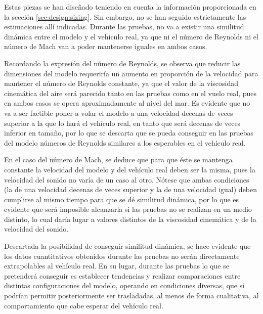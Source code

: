 Estas piezas se han diseñado teniendo en cuenta la información proporcionada en la sección \ref{sec:design:sizing}. Sin embargo, no se han seguido estrictamente las estimaciones allí indicadas. Durante las pruebas, no va a existir una similitud dinámica entre el modelo y el vehículo real, ya que ni el número de Reynolds ni el número de Mach van a poder mantenerse iguales en ambos casos.

Recordando la expresión del número de Reynolds,
se observa que reducir las dimensiones del modelo requeriría un aumento en proporción de la velocidad para mantener el número de Reynolds constante, ya que el valor de la viscosidad cinemática del aire será parecido tanto en las pruebas como en el vuelo real, pues en ambos casos se opera aproximadamente al nivel del mar. Es evidente que no va a ser factible poner a volar el modelo a una velocidad decenas de veces superior a la que lo hará el vehículo real, en tanto que será decenas de veces inferior en tamaño, por lo que se descarta que se pueda conseguir en las pruebas del modelo números de Reynolds similares a los esperables en el vehículo real.

En el caso del número de Mach, se deduce que para que éste se mantenga constante la velocidad del modelo y del vehículo real deben ser la misma, pues la velocidad del sonido no varía de un caso al otro. Nótese que ambas condiciones (la de una velocidad decenas de veces superior y la de una velocidad igual) deben cumplirse al mismo tiempo para que se dé similitud dinámica, por lo que es evidente que será imposible alcanzarla si las pruebas no se realizan en un medio distinto, lo cual daría lugar a valores distintos de la viscosidad cinemática y de la velocidad del sonido.

Descartada la posibilidad de conseguir similitud dinámica, se hace evidente que los datos cuantitativos obtenidos durante las pruebas no serán directamente extrapolables al vehículo real. En su lugar, durante las pruebas lo que se pretenderá conseguir es establecer tendencias y realizar comparaciones entre distintas configuraciones del modelo, operando en condiciones diversas, que sí podrían permitir posteriormente ser trasladadas, al menos de forma cualitativa, al comportamiento que cabe esperar del vehículo real.

